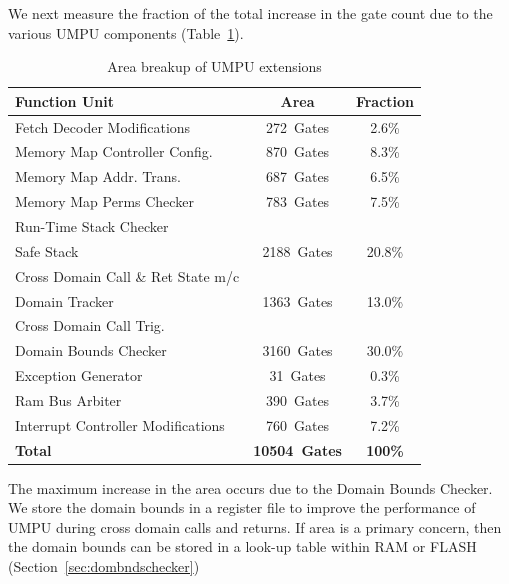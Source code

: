 %
We next measure the fraction of the total increase in the gate count
due to the various UMPU components (Table~\ref{tab:umpuareacomp}).
%
\begin{table}[htdp]
\centering
\tiny{\def\X{\hphantom{0}}\def\XX{\X\X}\def\XXX{\XX\X}\def\Y{\raise1pt\hbox{\strut}}
\begin{tabular}{|l|c|c|}
	\hline
        \hline
	\textbf{Function Unit} & \textbf{Area} & \textbf{Fraction}\\
	\hline
        \hline
        Fetch Decoder Modifications & \XX{}272~Gates & \XX{}2.6\%\\
        \hline
	Memory Map Controller Config. & \XX{}870~Gates & \XX{}8.3\%\\
        \hline
        Memory Map Addr. Trans.       & \XX{}687~Gates & \XX{}6.5\%\\
        \hline
        Memory Map Perms Checker & \XX{}783~Gates& \XX{}7.5\%\\
        Run-Time Stack Checker & & \\
        \hline
        Safe Stack & \X{}2188~Gates & \X{}20.8\%\\
        Cross Domain Call \& Ret State m/c & &\\
	\hline
        Domain Tracker & \X{}1363~Gates & \X{}13.0\%\\
        Cross Domain Call Trig. &&\\
        \hline
        Domain Bounds Checker & \X{}3160~Gates & \X{}30.0\%\\
        \hline
        Exception Generator & \XXX{}31~Gates & \XX{}0.3\%\\
        \hline
        Ram Bus Arbiter & \XX{}390~Gates & \XX{}3.7\%\\
        \hline
        Interrupt Controller Modifications & \XX{}760~Gates & \XX{}7.2\%\\
        \hline
        \hline
        \textbf{Total} & \textbf{10504~Gates} & \textbf{100\%}\\
        \hline
        \hline
\end{tabular}}
\caption{Area breakup of UMPU extensions}
\label{tab:umpuareacomp}
\end{table}

%
The maximum increase in the area occurs due to the Domain Bounds
Checker.
%
We store the domain bounds in a register file to improve the
performance of UMPU during cross domain calls and returns.
%
If area is a primary concern, then the domain bounds can be stored in
a look-up table within RAM or FLASH (Section~\ref{sec:dombndschecker})
%
